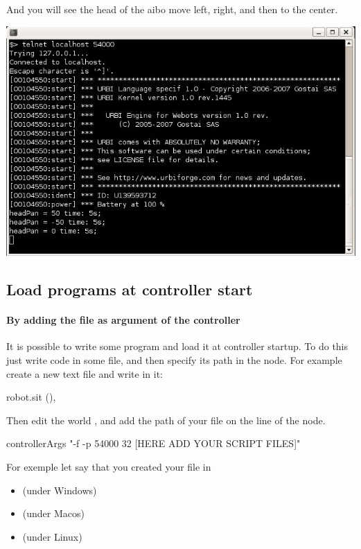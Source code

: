 And you will see the head of the aibo move left, right, and then to
the center.

\begin{center}
  \includegraphics[width=.8\linewidth]{img/webots/telnet-some-urbi-cmd}
\end{center}

\subsection{Load \urbi programs at controller start}

\paragraph{By adding the file as argument of the \urbi controller}

It is possible to write some \us program and load it at controller
startup.  To do this just write \us code in some file, and then
specify its path in the  \webots node.  For
example create a new text file  and write in it:

\begin{urbiunchecked}
robot.sit (),
\end{urbiunchecked}

Then edit the \webots world , and
add the path of your file  on the line of the
 node.


\begin{shell}
controllerArgs "-f -p 54000 32 [HERE ADD YOUR SCRIPT FILES]"
\end{shell}

For exemple let say that you created your file in
\begin{itemize}
\item {}
  (under Windows)
\item {}
  (under Macos)
\item {}
  (under Linux)
\end{itemize}

